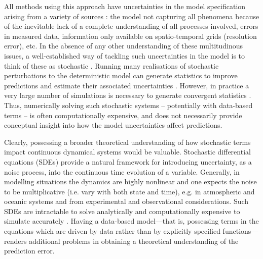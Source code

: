 All methods using this approach have uncertainties in the model specification arising from a variety of sources \cite{FangEtAl_2020_DisentanglingResolutionPrecision}: the model not capturing all phenomena because of the inevitable lack of a complete understanding of all processes involved, errors in measured data, information only available on spatio-temporal grids (resolution error), etc.
In the absence of any other understanding of these multitudinous issues, a well-established way of tackling such uncertainties in the model is to think of these as stochastic
\cite{BernerEtAl_2017_StochasticParameterizationNew,Oksendal_2003_StochasticDifferentialEquations}.
Running many realisations of stochastic perturbations to the deterministic model can generate statistics to improve predictions and estimate their associated uncertainties \cite[e.g.]{BadzaEtAl_2023_HowSensitiveAre,Collins_2007_EnsemblesProbabilitiesNew}.
However, in practice a very large number of simulations is necessary to generate convergent statistics \cite{FepponLermusiaux_2018_DynamicallyOrthogonalNumerical, Leutbecher_2019_EnsembleSizeHow}.
Thus, numerically solving such stochastic systems -- potentially with data-based terms -- is often computationally expensive, and does not necessarily provide conceptual insight into how the model uncertainties affect predictions.

Clearly, possessing a broader theoretical understanding of how stochastic terms impact continuous dynamical systems would be valuable.
Stochastic differential equations (SDEs) provide a natural framework for introducing uncertainty, as a noise process, into the continuous time evolution of a variable.
Generally, in modelling situations the dynamics are highly nonlinear and one expects the noise to be multiplicative (i.e. vary with both state and time), e.g. in atmospheric \cite{Sura_2003_StochasticAnalysisSouthern, SuraEtAl_2005_MultiplicativeNoiseNonGaussianity} and oceanic \cite{KamenkovichEtAl_2015_PropertiesOriginsAnisotropic} systems and from experimental and observational considerations.
Such SDEs are intractable to solve analytically \cite{Oksendal_2003_StochasticDifferentialEquations} and computationally expensive to simulate accurately \cite{MoraEtAl_2017_StableNumericalScheme}.
Having a data-based model---that is, possessing terms in the equations which are driven by data rather than by explicitly specified functions---renders additional problems in obtaining a theoretical understanding of the prediction error.

